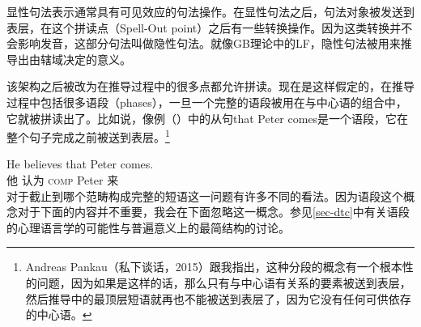 显性句法表示通常具有可见效应的句法操作。在显性句法之后，句法对象被发送到表层，在这个拼读点（Spell-Out point）之后有一些转换操作。因为这类转换并不会影响发音，这部分句法叫做隐性句法。就像GB理论中的LF，隐性句法被用来推导出由辖域决定的意义。

该架构之后被改为在推导过程中的很多点都允许拼读。现在是这样假定的，在推导过程中包括很多语段（phases），一旦一个完整的语段被用在与中心语的组合中\citep{Chomsky2008a}，它就被拼读出了。比如说，像例（）中的从句that Peter comes是一个语段，它在整个句子完成之前被送到表层。\footnote{%
Andreas Pankau（私下谈话，2015）跟我指出，这种分段的概念有一个根本性的问题，因为如果是这样的话，那么只有与中心语有关系的要素被送到表层，然后推导中的最顶层短语就再也不能被送到表层了，因为它没有任何可供依存的中心语。
}

\ea
\gll He believes that Peter comes.\\
他 认为 \textsc{comp} Peter 来\\
\z
对于截止到哪个范畴构成完整的短语这一问题有许多不同的看法。因为语段这个概念对于下面的内容并不重要，我会在下面忽略这一概念。参见\ref{sec-dtc}中有关语段的心理语言学的可能性与普遍意义上的最简结构的讨论。

